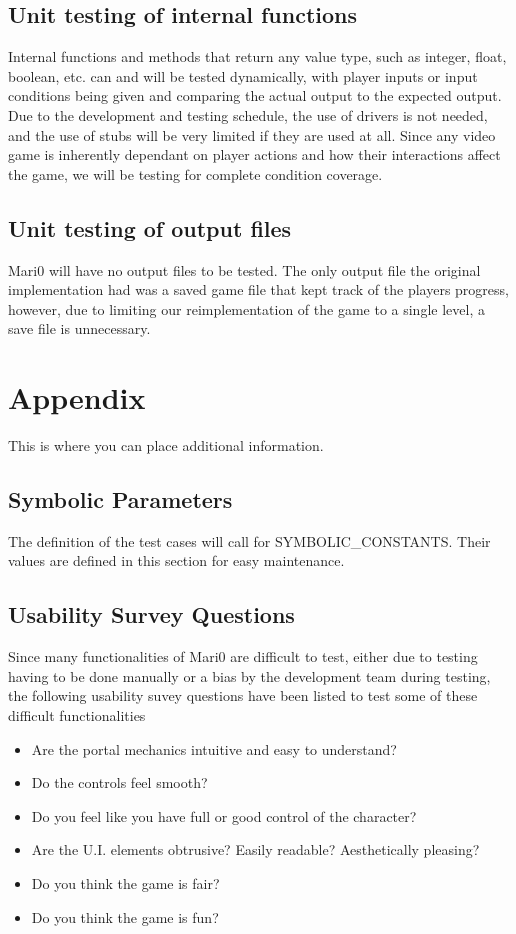 \documentclass[12pt, titlepage]{article}
\begin{document}
\subsection{Unit testing of internal functions}
	Internal functions and methods that return any value type, such as integer, float, boolean, etc. can and will be tested dynamically, with player inputs or input conditions being given and comparing the actual output to the expected output. Due to the development and testing schedule, the use of drivers is not needed, and the use of stubs will be very limited if they are used at all. Since any video game is inherently dependant on player actions and how their interactions affect the game, we will be testing for complete condition coverage.
\subsection{Unit testing of output files}		
	Mari0 will have no output files to be tested. The only output file the original implementation had was a saved game file that kept track of the players progress, however, due to limiting our reimplementation of the game to a single level, a save file is unnecessary.




\newpage

\section{Appendix}

This is where you can place additional information.

\subsection{Symbolic Parameters}

The definition of the test cases will call for SYMBOLIC\_CONSTANTS.
Their values are defined in this section for easy maintenance.

\subsection{Usability Survey Questions}

Since many functionalities of Mari0 are difficult to test, either due to testing having to be done manually or a bias by the development team during testing, the following usability suvey questions have been listed to test some of these difficult functionalities

\begin{itemize}
  \item Are the portal mechanics intuitive and easy to understand?
  \item Do the controls feel smooth?
  \item Do you feel like you have full or good control of the character?
  \item Are the U.I. elements obtrusive? Easily readable? Aesthetically pleasing?
  \item Do you think the game is fair?
  \item Do you think the game is fun?
\end{itemize}
\end{document}
